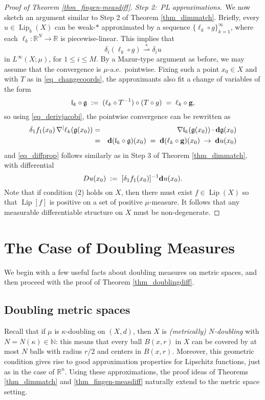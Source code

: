 \documentclass[reqno]{amsart}
\theoremstyle{plain}
\theoremstyle{definition}
\theoremstyle{remark}
\numberwithin{equation}{section}
\renewcommand{\d}{\delta}
\newcommand{\g}{\mathfrak{g}}
\newcommand{\Lip}{\operatorname{Lip}}
\newcommand{\N}{\mathbb{N}}
\newcommand{\R}{\mathbb{R}}
\newcommand{\wsto}{\stackrel{*}{\rightharpoonup}}
\begin{document}
\begin{proof}[Proof of Theorem \ref{thm_fingen-measdiff}]
\vspace{.05in}
{\em Step 2:\ PL approximations}.\ We now sketch an argument similar to Step 2 of Theorem \ref{thm_dimmatch}.
Briefly, every $u \in \Lip_b(X)$ can be weak-$*$ approximated by a sequence $\{\ell_k \circ g \}_{k=1}^\infty$, where each $\ell_k : \R^N \to \R$ is piecewise-linear.  This implies that 
$$
\d_i(\ell_k \circ g) \wsto \d_iu
$$
in $L^\infty(X;\mu)$, for $1 \leq i \leq M$.  By a Mazur-type argument as before, we may assume that the convergence is $\mu$-a.e.\ pointwise.  Fixing such a point $x_0 \in X$ and with $T$ as in \eqref{eq_changecoords}, the approximants also fit a change of variables of the form
$$
\mathfrak{l}_k \circ \g \;:=\; (\ell_k \circ T^{-1}) \circ (T \circ g) \;=\; \ell_k \circ {\bf g},
$$
so using \eqref{eq_derivjacobi}, the pointwise convergence can be rewritten as
\begin{eqnarray*}
\d_1f_1(x_0) \, \nabla^|\ell_k(\g(x_0)) &=&
\nabla\mathfrak{l}_k(\g(x_0)) \cdot {\bf d}\g(x_0) \\ &=&
{\bf d}(\mathfrak{l}_k \circ \g)(x_0) \;=\;
{\bf d}(\ell_k \circ {\bf g})(x_0) \;\to\; {\bf d}u(x_0)
\end{eqnarray*}
and \eqref{eq_diffprop} follows similarly as in Step 3 of Theorem \ref{thm_dimmatch}, with differential 
$$
Du(x_0) \;:=\; [\d_1f_1(x_0)]^{-1} {\bf d}u(x_0). 
$$
Note that if condition (2) holds on $X$, then there must exist $f \in \Lip(X)$ so that $\Lip[f]$ is positive on a set of positive $\mu$-measure.  It follows that any measurable differentiable structure on $X$ must be non-degenerate.
\end{proof}




\section{The Case of Doubling Measures} \label{sect_doubling}

We begin with a few useful facts about doubling measures on metric spaces, and then proceed with the proof of Theorem \ref{thm_doublingdiff}.


\subsection{Doubling metric spaces}

Recall that if $\mu$ is $\kappa$-doubling on $(X,d)$, then $X$ is {\em (metrically) $N$-doubling} with $N = N(\kappa) \in \N$: this means that every ball $B(x,r)$ in $X$ can be covered by at most $N$ balls with radius $r/2$ and centers in $B(x,r)$.  Moreover, this geometric condition gives rise to good approximation properties for Lipschitz functions, just as in the case of $\R^n$.  Using these approximations, the proof ideas of Theorems \ref{thm_dimmatch} and \ref{thm_fingen-measdiff} naturally extend to the metric space setting.
\end{document}

